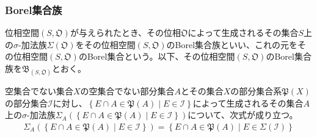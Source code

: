 \documentclass[dvipdfmx]{jsarticle}
\begin{document}
\subsubsection{Borel集合族}%
\begin{dfn}
位相空間$\left( S,\mathfrak{O} \right)$が与えられたとき、その位相$\mathfrak{O}$によって生成されるその集合$S$上の$\sigma$-加法族$\varSigma\left( \mathfrak{O} \right)$をその位相空間$\left( S,\mathfrak{O} \right)$のBorel集合族といい、これの元をその位相空間$\left( S,\mathfrak{O} \right)$のBorel集合という。以下、その位相空間$\left( S,\mathfrak{O} \right)$のBorel集合族を$\mathfrak{B}_{\left( S,\mathfrak{O} \right)}$とおく。
\end{dfn}
\begin{thm}\label{4.5.2.8}
空集合でない集合$X$の空集合でない部分集合$A$とその集合$X$の部分集合系$\mathfrak{P}(X)$の部分集合$\mathcal{I}$に対し、$\left\{ E \cap A \in \mathfrak{P}(A) \middle| E\in \mathcal{I} \right\}$によって生成されるその集合$A$上の$\sigma$-加法族$\varSigma_{A}\left( \left\{ E \cap A \in \mathfrak{P}(A) \middle| E\in \mathcal{I} \right\} \right)$について、次式が成り立つ。
\begin{align*}
\varSigma_{A}\left( \left\{ E \cap A \in \mathfrak{P}(A) \middle| E\in \mathcal{I} \right\} \right) = \left\{ E \cap A \in \mathfrak{P}(A) \middle| E \in \varSigma\left( \mathcal{I} \right) \right\}
\end{align*}
\end{thm}
\end{document}
